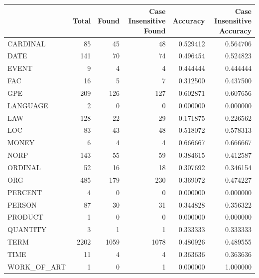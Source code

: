 \begin{tabular}{lrrrrr}
\toprule
 & Total & Found & Case Insensitive Found & Accuracy & Case Insensitive Accuracy \\
\midrule
CARDINAL & 85 & 45 & 48 & 0.529412 & 0.564706 \\
DATE & 141 & 70 & 74 & 0.496454 & 0.524823 \\
EVENT & 9 & 4 & 4 & 0.444444 & 0.444444 \\
FAC & 16 & 5 & 7 & 0.312500 & 0.437500 \\
GPE & 209 & 126 & 127 & 0.602871 & 0.607656 \\
LANGUAGE & 2 & 0 & 0 & 0.000000 & 0.000000 \\
LAW & 128 & 22 & 29 & 0.171875 & 0.226562 \\
LOC & 83 & 43 & 48 & 0.518072 & 0.578313 \\
MONEY & 6 & 4 & 4 & 0.666667 & 0.666667 \\
NORP & 143 & 55 & 59 & 0.384615 & 0.412587 \\
ORDINAL & 52 & 16 & 18 & 0.307692 & 0.346154 \\
ORG & 485 & 179 & 230 & 0.369072 & 0.474227 \\
PERCENT & 4 & 0 & 0 & 0.000000 & 0.000000 \\
PERSON & 87 & 30 & 31 & 0.344828 & 0.356322 \\
PRODUCT & 1 & 0 & 0 & 0.000000 & 0.000000 \\
QUANTITY & 3 & 1 & 1 & 0.333333 & 0.333333 \\
TERM & 2202 & 1059 & 1078 & 0.480926 & 0.489555 \\
TIME & 11 & 4 & 4 & 0.363636 & 0.363636 \\
WORK_OF_ART & 1 & 0 & 1 & 0.000000 & 1.000000 \\
\bottomrule
\end{tabular}
